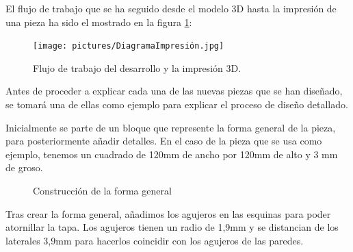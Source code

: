 El flujo de trabajo que se ha seguido desde el modelo 3D hasta la impresión de una pieza ha sido el mostrado en la figura \ref{fig:flujo_3d}:

\begin{figure}[H]
    \centering
    \texttt{[image: pictures/DiagramaImpresión.jpg]}
    \caption{Flujo de trabajo del desarrollo y la impresión 3D.}
    \label{fig:flujo_3d}
\end{figure}

Antes de proceder a explicar cada una de las nuevas piezas que se han diseñado, se tomará una de ellas como ejemplo para explicar el proceso de diseño detallado.

Inicialmente se parte de un bloque que represente la forma general de la pieza, para posteriormente añadir detalles. En el caso de la pieza que se usa como ejemplo, tenemos un cuadrado de 120mm de ancho por 120mm de alto y 3 mm de groso.

\begin{figure}[H]
\centering
{}
\caption{Construcción de la forma general}
\label{fig:forma_general_tapa_superior}
\end{figure}

Tras crear la forma general, añadimos los agujeros en las esquinas para poder atornillar la tapa. Los agujeros tienen un radio de 1,9mm y se distancian de los laterales 3,9mm para hacerlos coincidir con los agujeros de las paredes.

